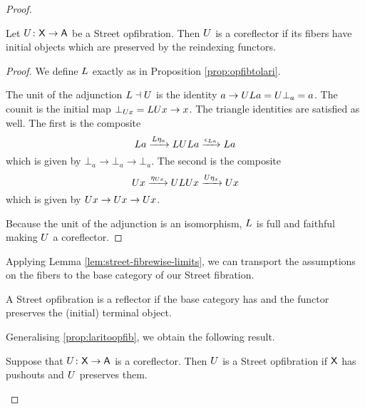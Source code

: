 \documentclass{amsart}
\begin{document}
\begin{proof}
\begin{prop} \label{thm:street-opfib-to-corefl}
  Let $ U \colon \mathsf{X} \to \mathsf{A} $ be a Street opfibration. Then $ U $ is a coreflector if its fibers have initial objects which are preserved by the reindexing functors.
\end{prop}

\begin{proof}
  We define $ L $ exactly as in Proposition
  \ref{prop:opfibtolari}. 

  The unit of the adjunction $ L \dashv U $ is the
  identity $ a\to UL a = U\bot_a = a $.  The
  counit is the initial map $ \bot_{U x} = LU x \to
  x $.  The triangle identities are satisfied as
  well. The first is the composite
  \[
    L a
    \xrightarrow{L\eta_a}        LUL a
    \xrightarrow{\epsilon_{L a}} L a
  \]
  which is given by $ \bot_a \to \bot_a \to \bot_a
  $.  The second is the composite
  \[
    U x
    \xrightarrow{\eta_{U x}} ULU x
    \xrightarrow{U\eta_x}    U x
  \]
  which is given by $ U x \to U x \to U x $.

  Because the unit of the adjunction is an
  isomorphism, $ L $ is full and faithful
  \cite[{Prop.~1.3}]{gabrielzisman} making $ U $ a
  coreflector.
\end{proof}

Applying Lemma \ref{lem:street-fibrewise-limits}, we can
transport the assumptions on the fibers to the base category
of our Street fibration.

\begin{cor}
  A Street opfibration is a reflector if the base
  category has and the functor preserves the (initial)
  terminal object.
\end{cor}

Generalising \cref{prop:laritoopfib}, we obtain the following result.

\begin{prop}
  \label{thm:corefl-to-street-opfib}
  Suppose that $ U \colon \mathsf{X} \to \mathsf{A} $ is a
  coreflector. Then $ U $ is a Street opfibration
  if $ \mathsf{X} $ has pushouts and $ U $ preserves them.
\end{prop}


\end{proof}
\end{document}
